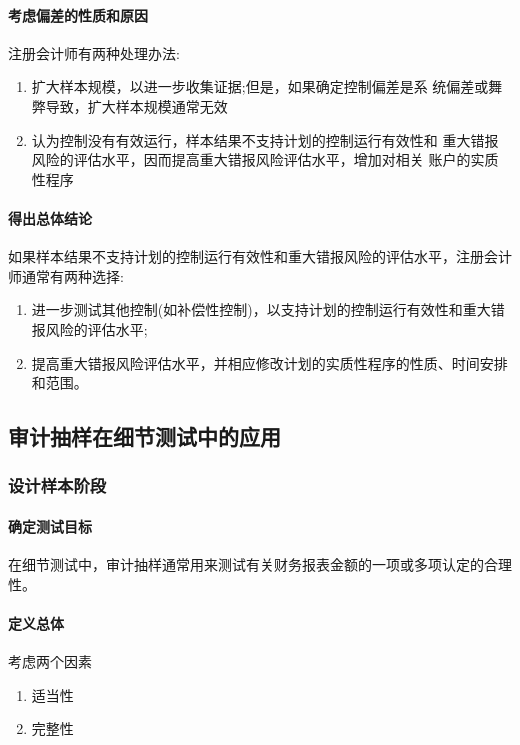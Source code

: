 \documentclass[UTF8,12pt]{ctexart}
\numberwithin{equation}{section} %
\numberwithin{figure}{section}
\numberwithin{table}{section}
\begin{document}
	\paragraph{考虑偏差的性质和原因}
	注册会计师有两种处理办法: 
	\begin{enumerate}
		\item 扩大样本规模，以进一步收集证据;但是，如果确定控制偏差是系 统偏差或舞弊导致，扩大样本规模通常无效
		
		\item 认为控制没有有效运行，样本结果不支持计划的控制运行有效性和 重大错报风险的评估水平，因而提高重大错报风险评估水平，增加对相关 账户的实质性程序
	\end{enumerate}
	
	\paragraph{得出总体结论}
	如果样本结果不支持计划的控制运行有效性和重大错报风险的评估水平，注册会计师通常有两种选择:
	\begin{enumerate}
		\item 进一步测试其他控制(如补偿性控制)，以支持计划的控制运行有效性和重大错报风险的评估水平;
		
		\item 提高重大错报风险评估水平，并相应修改计划的实质性程序的性质、时间安排和范围。
	\end{enumerate}
	
	
	
	\subsection{审计抽样在细节测试中的应用}
	
	\subsubsection{设计样本阶段}
	\paragraph{确定测试目标} 在细节测试中，审计抽样通常用来测试有关财务报表金额的一项或多项认定的合理性。
	
	\paragraph{定义总体} 考虑两个因素
	\begin{enumerate}
		\item 适当性
		
		\item 完整性
	\end{enumerate}
	
\end{document}
